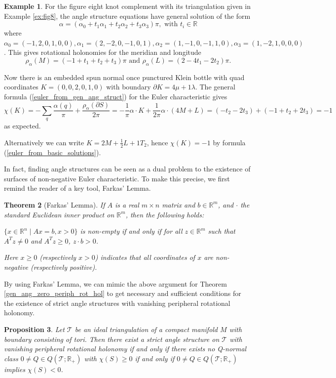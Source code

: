 \documentclass[12pt,reqno]{amsart}  %
\newtheorem{thm}{Theorem}[section]
\newtheorem{prop}[thm]{Proposition}
\theoremstyle{definition}
\newtheorem{ex}[thm]{Example}
\theoremstyle{remark}
\def\R{\mathbb{R}}
\newcommand{\T}{\mathcal{T}}
\def\bd{\partial}
\begin{document}
\begin{ex} 
For the figure eight knot complement with its triangulation given in 
Example \ref{ex:fig8}, the angle structure equations have general 
solution of the form 
$$
\alpha= (\alpha_0+t_1 \alpha_1 + t_2 \alpha_2 + t_3 \alpha_3)\pi, 
\text{ with } t_i \in \R
$$
where $\alpha_0=(-1, 2, 0, 1, 0, 0), \alpha_1=(2, -2, 0, -1, 0, 1), 
\alpha_2=(1, -1, 0, -1, 1, 0),\alpha_3=(1, -2, 1, 0, 0, 0)$.
This gives rotational holonomies for the meridian and longitude
$$
\rho_\alpha(M)= (-1 + t_1 + t_2 + t_3)\pi  \text{ and }  \rho_\alpha(L)
= (2 - 4 t_1 - 2 t_2)\pi.
$$

Now there is an embedded spun normal once punctured Klein bottle with quad 
coordinates 
$K=(0,0,2,0,1,0)$ with boundary $\bd K = 4 \mu + 1 \lambda$.  
The general formula (\ref{euler_from_gen_ang_struct}) for the Euler 
characteristic gives
$$
\chi(K) = - \sum_q \frac{\alpha(q)}{\pi} + \frac{ \rho_\alpha(\bd S)}{2\pi}
=-\frac{1}{\pi} \alpha\cdot K + \frac{1}{2\pi} \alpha \cdot(4M+L) 
= (-t_2-2t_3)+(-1+t_2+2t_3) = -1
$$
as expected.

Alternatively we can write $K= 2M + \frac{1}{2} L  + 1 T_2$, hence 
$\chi(K)=-1$ by formula (\ref{euler_from_basic_solutions}).
\end{ex}

In fact, finding angle structures can be seen as a dual problem to the 
existence of surfaces of non-negative Euler characteristic. To make this 
precise, we first remind the reader of a key tool, Farkas' Lemma. 

\begin{thm}[Farkas' Lemma]
If $A$ is a real $m\times n$ matrix and $b \in \R^m$, and $\cdot$ the 
standard Euclidean inner product on $\R^m$, then the following holds:

$\{x \in \R^n \mid Ax=b, x>0 \}$ is non-empty if and only if for all 
$z\in \R^m$ such that $A^Tz \neq 0$ and $A^Tz\geq0$, $z\cdot b>0$.

Here $x \geq 0$ (respectively $x > 0$) indicates that all coordinates 
of $x$ are non-negative (respectively positive). 
\end{thm}

By using Farkas' Lemma, we can mimic the above argument for 
Theorem \ref{gen_ang_zero_periph_rot_hol} to get necessary and 
sufficient conditions for the existence of strict angle structures with 
vanishing peripheral rotational holonomy. 

\begin{prop}
Let $\T$ be an ideal triangulation of a compact manifold $M$ with 
boundary consisting of tori. Then there exist a strict angle structure 
on $\T$ with vanishing peripheral rotational holonomy if and only if 
there exists no Q-normal class $0 \ne Q \in Q(\T;\R_+)$ with $\chi(S)\ge 0$ 
if and only if $0 \ne Q \in Q(\T;\R_+)$ implies $\chi(S)< 0$.
\end{prop}
\end{document}
